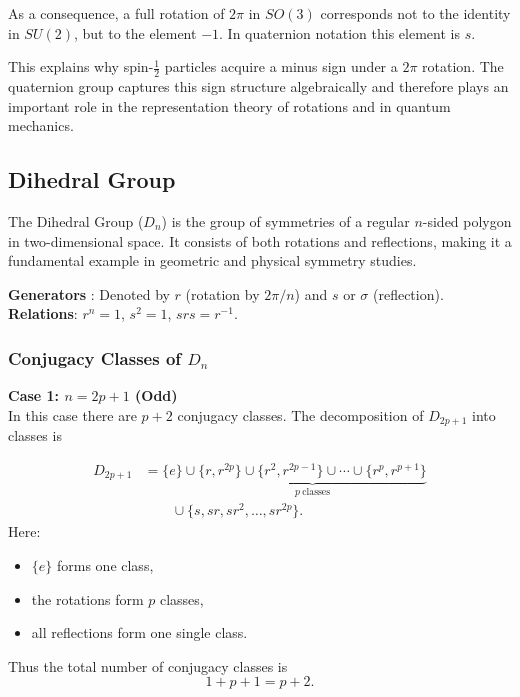 \documentclass[a4paper,12pt]{article}
\theoremstyle{definition}
\begin{document}
As a consequence, a full rotation of $2\pi$ in $SO(3)$ corresponds not to the identity in $SU(2)$, but to the element $-1$. In quaternion notation this element is $s$.

This explains why spin-$\tfrac{1}{2}$ particles acquire a minus sign under a $2\pi$ rotation. 
The quaternion group captures this sign structure algebraically and therefore plays an important role in the representation theory of rotations and in quantum mechanics.

\subsection{Dihedral Group}
The Dihedral Group ($D_n$) is the group of symmetries of a regular $n$-sided polygon in two-dimensional space. It consists of both rotations and reflections, making it a fundamental example in geometric and physical symmetry studies.


\noindent\textbf{Generators} : 
Denoted by $r$ (rotation by $2\pi/n$) and $s$ or $\sigma$ (reflection). \\
\noindent\textbf{Relations}: $r^n = 1$, $s^2 = 1$, $srs = r^{-1}$.

\subsubsection*{Conjugacy Classes of $D_n$}


\textbf{Case 1: $n = 2p+1$ (Odd)} \\
In this case there are $p+2$ conjugacy classes. The decomposition of $D_{2p+1}$ into classes is

\begin{equation*}
\begin{aligned}
D_{2p+1}
&=
\{e\}
\cup
\underbrace{
\{r,r^{2p}\}\cup
\{r^2,r^{2p-1}\}\cup
\cdots\cup
\{r^p,r^{p+1}\}
}_{p\ \text{classes}}
\\
&\qquad\cup
\{s,sr,sr^2,\dots,sr^{2p}\}.
\end{aligned}
\end{equation*}
Here:
\begin{itemize}
\item $\{e\}$ forms one class,
\item the rotations form $p$ classes,
\item all reflections form one single class.
\end{itemize}
Thus the total number of conjugacy classes is
\begin{equation*}
1+p+1=p+2.
\end{equation*}
\end{document}

